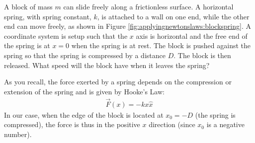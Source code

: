 \begin{example}{A block of mass $m$ can slide freely along a frictionless surface. A horizontal spring, with spring constant, $k$, is attached to a wall on one end, while the other end can move freely, as shown in Figure \ref{fig:applyingnewtonslaws:blockspring}. A coordinate system is setup such that the $x$ axis is horizontal and the free end of the spring is at $x=0$ when the spring is at rest. The block is pushed against the spring so that the spring is compressed by a distance $D$. The block is then released. What speed will the block have when it leaves the spring?}

As you recall, the force exerted by a spring depends on the compression or extension of the spring and is given by Hooke's Law:
\begin{align*}
\vec F(x) = -kx\hat x
\end{align*}
In our case, when the edge of the block is located at $x_0=-D$ (the spring is compressed), the force is thus in the positive $x$ direction (since $x_0$ is a negative number). 


\end{example}
